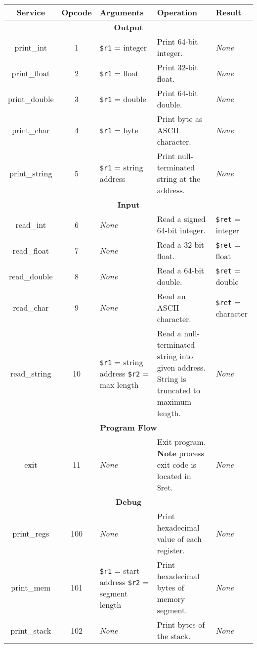 \documentclass{article}
\begin{document}
\bigskip
\begin{longtable}{|c|c|l|l|l|}
    \hline
    \textbf{Service} & \textbf{Opcode} & \textbf{Arguments} & \textbf{Operation} & \textbf{Result} \\
    \hline
    \multicolumn{5}{|c|}{\textbf{Output}} \\
    \hline
    print\_int & 1 & \texttt{\$r1} = integer & Print 64-bit integer. & \textit{None} \\
    \hline
    print\_float & 2 & \texttt{\$r1} = float & Print 32-bit float. & \textit{None} \\
    \hline
    print\_double & 3 & \texttt{\$r1} = double & Print 64-bit double. & \textit{None} \\
    \hline
    print\_char & 4 & \texttt{\$r1} = byte & Print byte as ASCII character. & \textit{None} \\
    \hline
    print\_string & 5 & \texttt{\$r1} = string address & Print null-terminated string at the address. & \textit{None} \\
    \hline \hline
    \multicolumn{5}{|c|}{\textbf{Input}} \\
    \hline
    read\_int & 6 & \textit{None} & Read a signed 64-bit integer. & \texttt{\$ret} = integer \\
    \hline
    read\_float & 7 & \textit{None} & Read a 32-bit float. & \texttt{\$ret} = float \\
    \hline
    read\_double & 8 & \textit{None} & Read a 64-bit double. & \texttt{\$ret} = double \\
    \hline
    read\_char & 9 & \textit{None} & Read an ASCII character. & \texttt{\$ret} = character \\
    \hline
    read\_string & 10 & \makecell[l]{\texttt{\$r1} = string address\\%
    \texttt{\$r2} = max length} & \makecell[l]{Read a null-terminated string into given address.\\%
    String is truncated to maximum length.} & \textit{None} \\
    \hline \hline
    \multicolumn{5}{|c|}{\textbf{Program Flow}} \\
    \hline
    exit & 11 & \textit{None} & \makecell[l]{Exit program.\\%
    \textbf{Note} process exit code is located in \$ret.} & \textit{None} \\
    \hline \hline
    \multicolumn{5}{|c|}{\textbf{Debug}} \\
    \hline
    print\_regs & 100 & \textit{None} & Print hexadecimal value of each register. & \textit{None} \\
    \hline
    print\_mem & 101 & \makecell[l]{\texttt{\$r1} = start address\\%
    \texttt{\$r2} = segment length} & Print hexadecimal bytes of memory segment. & \textit{None} \\
    \hline
    print\_stack & 102 & \textit{None} & Print bytes of the stack. & \textit{None} \\
    \hline
\end{longtable}
\end{document}
